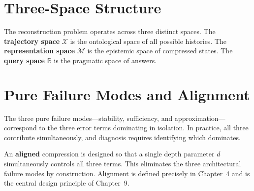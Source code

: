 \section{Three-Space Structure}

The reconstruction problem operates across three distinct spaces. The \textbf{trajectory space} $\mathcal{X}$ is the ontological space of all possible histories. The \textbf{representation space} $\mathcal{M}$ is the epistemic space of compressed states. The \textbf{query space} $\mathbb{R}$ is the pragmatic space of answers.

\section{Pure Failure Modes and Alignment}

The three pure failure modes---stability, sufficiency, and approximation---correspond to the three error terms dominating in isolation. In practice, all three contribute simultaneously, and diagnosis requires identifying which dominates.

An \textbf{aligned} compression is designed so that a single depth parameter $d$ simultaneously controls all three terms. This eliminates the three architectural failure modes by construction. Alignment is defined precisely in Chapter~4 and is the central design principle of Chapter~9.
